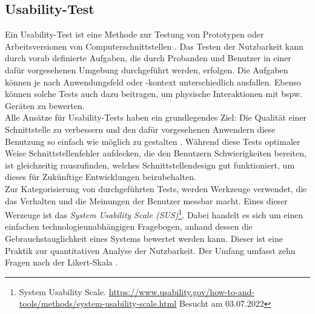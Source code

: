     \subsection{Usability-Test}
    \label{subsec:usabilitytests}
        Ein Usability-Test ist eine Methode zur Testung von Prototypen oder Arbeitsversionen von Computerschnittstellen \cite{LAZAR2017263}. 
        Das Testen der Nutzbarkeit kann durch vorab definierte Aufgaben, die durch Probanden und Benutzer in einer dafür vorgesehenen 
        Umgebung durchgeführt werden, erfolgen. Die Aufgaben können je nach Anwendungsfeld oder -kontext unterschiedlich ausfallen. 
        Ebenso können solche Tests auch dazu beitragen, um physische Interaktionen mit bspw. Geräten zu bewerten. 
        \\
        Alle Ansätze für Usability-Tests haben ein grundlegendes Ziel: Die Qualität einer Schnittstelle zu verbessern und den 
        dafür vorgesehenen Anwendern diese Benutzung so einfach wie möglich zu gestalten \cite{LAZAR2017263}. Während diese Tests optimaler 
        Weise Schnittstellenfehler aufdecken, die den Benutzern Schwierigkeiten bereiten, ist gleichzeitig rauszufinden, welches Schnittstellendesign 
        gut funktioniert, um dieses für Zukünftige Entwicklungen beizubehalten. 
        \\
        \linebreak
        Zur Kategorisierung von durchgeführten Tests, werden Werkzeuge verwendet, die das Verhalten und die Meinungen der Benutzer 
        messbar macht. Eines dieser Werzeuge ist das \textit{System Usability Scale (SUS)}\footnote{System Usability Scale. \url{https://www.usability.gov/how-to-and-tools/methods/system-usability-scale.html} Besucht am 03.07.2022}. 
        Dabei handelt es sich um einen einfachen 
        technologieunabhängigen Fragebogen, anhand dessen die Gebrauchstauglichkeit eines Systems bewertet werden kann. Dieser 
        ist eine Praktik zur quantitativen Analyse der Nutzbarkeit. Der Umfang umfasst zehn Fragen nach der Likert-Skala \cite{likert1932technique}.

